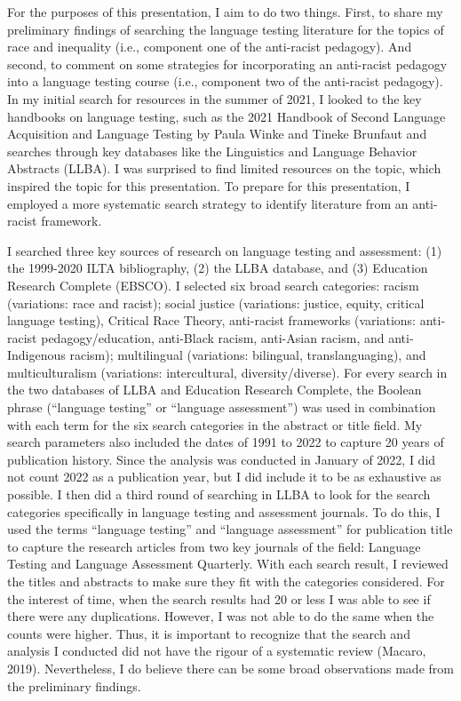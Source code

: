 \documentclass[
]{book}
\begin{document}
For the purposes of this presentation, I aim to do two things. First, to share my preliminary findings of searching the language testing literature for the topics of race and inequality (i.e., component one of the anti-racist pedagogy). And second, to comment on some strategies for incorporating an anti-racist pedagogy into a language testing course (i.e., component two of the anti-racist pedagogy). In my initial search for resources in the summer of 2021, I looked to the key handbooks on language testing, such as the 2021 Handbook of Second Language Acquisition and Language Testing by Paula Winke and Tineke Brunfaut and searches through key databases like the Linguistics and Language Behavior Abstracts (LLBA). I was surprised to find limited resources on the topic, which inspired the topic for this presentation. To prepare for this presentation, I employed a more systematic search strategy to identify literature from an anti-racist framework.

I searched three key sources of research on language testing and assessment: (1) the 1999-2020 ILTA bibliography, (2) the LLBA database, and (3) Education Research Complete (EBSCO). I selected six broad search categories: racism (variations: race and racist); social justice (variations: justice, equity, critical language testing), Critical Race Theory, anti-racist frameworks (variations: anti-racist pedagogy/education, anti-Black racism, anti-Asian racism, and anti-Indigenous racism); multilingual (variations: bilingual, translanguaging), and multiculturalism (variations: intercultural, diversity/diverse). For every search in the two databases of LLBA and Education Research Complete, the Boolean phrase (``language testing'' or ``language assessment'') was used in combination with each term for the six search categories in the abstract or title field. My search parameters also included the dates of 1991 to 2022 to capture 20 years of publication history. Since the analysis was conducted in January of 2022, I did not count 2022 as a publication year, but I did include it to be as exhaustive as possible. I then did a third round of searching in LLBA to look for the search categories specifically in language testing and assessment journals. To do this, I used the terms ``language testing'' and ``language assessment'' for publication title to capture the research articles from two key journals of the field: Language Testing and Language Assessment Quarterly. With each search result, I reviewed the titles and abstracts to make sure they fit with the categories considered. For the interest of time, when the search results had 20 or less I was able to see if there were any duplications. However, I was not able to do the same when the counts were higher. Thus, it is important to recognize that the search and analysis I conducted did not have the rigour of a systematic review (Macaro, 2019). Nevertheless, I do believe there can be some broad observations made from the preliminary findings.
\end{document}
